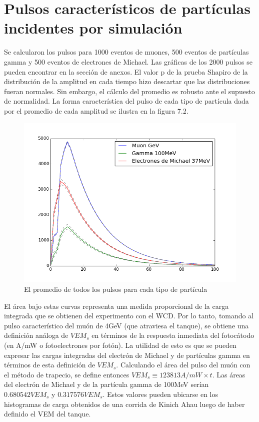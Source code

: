 \documentclass{book}
\begin{document}
\section{Pulsos caracter\'isticos de part\'iculas incidentes por simulaci\'on}

Se calcularon los pulsos para 1000 eventos de muones, 500 eventos de part\'iculas gamma y 500 eventos de electrones de Michael. Las gr\'aficas de los 2000 pulsos se pueden encontrar en la secci\'on de anexos. El valor p de la prueba Shapiro de la distribuci\'on de la amplitud en cada tiempo hizo descartar que las distribuciones fueran normales. Sin embargo, el c\'alculo del promedio es robusto ante el supuesto de normalidad. La forma caracter\'istica del pulso de cada tipo de part\'icula dada por el promedio de cada amplitud se ilustra en la figura 7.2.


\begin{figure}[h] %
\begin{center}
 \includegraphics[width=\linewidth]{PulsosCaracteristicos.png}
\caption{El promedio de todos los pulsos para cada tipo de part\'icula}
\end{center}
\end{figure}

El \'area bajo estas curvas representa una medida proporcional de la carga integrada que se obtienen del experimento con el WCD. Por lo tanto, tomando al pulso caracter\'istico del mu\'on de 4GeV (que atraviesa el tanque), se obtiene una definici\'on an\'aloga de $VEM_s$ en t\'erminos de la respuesta inmediata del fotoc\'atodo (en A/mW o fotoelectrones por fot\'on). La utilidad de esto es que se pueden expresar las cargas integradas del electr\'on de Michael y de part\'iculas gamma en t\'erminos de esta definici\'on de $VEM_s$. Calculando el \'area del pulso del mu\'on con el m\'etodo de trapecio, se define entonces $VEM_s \equiv 123813 A/mW\times t$. Las \'areas del electr\'on de Michael y de la part\'icula gamma de 100MeV ser\'ian $0.680542 VEM_s$ y $0.317576 VEM_s$. Estos valores pueden ubicarse en los histogramas de carga obtenidos de una corrida de Kinich Ahau luego de haber definido el VEM del tanque.
\end{document}
